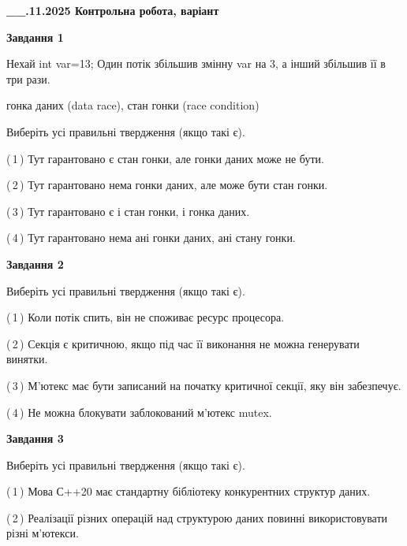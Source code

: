 \documentclass[12pt, ukrainian]{article}
\begin{document}
\begin {large}

\textbf{\_\_.11.2025 Контрольна робота, варіант  }\par


{

\begin{center}
\textbf{Завдання 1}
\end{center}
Нехай int var=13; Один потік збільшив змінну var на 3, а інший збільшив її в три рази.

гонка даних (data race), стан гонки (race condition)

Виберіть усі правильні твердження (якщо такі є).\par
\vspace{2mm}
(\,1\,) Тут гарантовано є стан гонки, але гонки даних може не бути.%

(\,2\,) Тут гарантовано нема гонки даних, але може бути стан гонки.%

(\,3\,) Тут гарантовано є і стан гонки, і гонка даних.%

(\,4\,) Тут гарантовано нема ані гонки даних, ані стану гонки.%



\begin{center}
\textbf{Завдання 2}
\end{center}
Виберіть усі правильні твердження (якщо такі є).\par
\vspace{2mm}

(\,1\,) Коли потік спить, він не споживає ресурс процесора.%

(\,2\,) Секція є критичною, якщо під час її виконання не можна генерувати винятки.%

(\,3\,) М’ютекс має бути записаний на початку критичної секції, яку він забезпечує.%

(\,4\,) Не можна блокувати заблокований м’ютекс mutex.%



\begin{center}
\textbf{Завдання 3}
\end{center}
Виберіть усі правильні твердження (якщо такі є).\par
\vspace{2mm}

(\,1\,) Мова С++20 має стандартну бібліотеку конкурентних структур даних.%

(\,2\,) Реалізації різних операцій над структурою даних повинні використовувати різні м’ютекси.%

}
\end{large}
\end{document}
